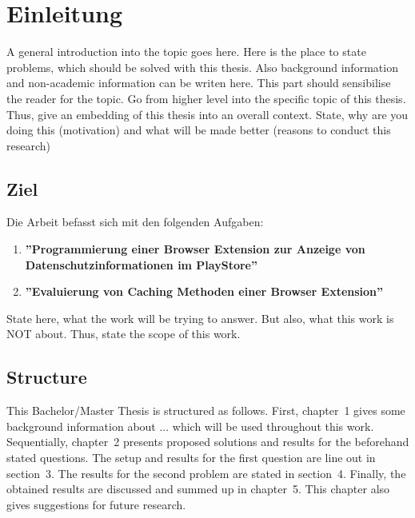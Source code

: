 \chapter{Einleitung}
\label{c:introduction}

A general introduction into the topic goes here. Here is the place to state problems, which should be solved with this thesis. Also background information and non-academic information can be writen here. This part should sensibilise the reader for the topic. Go from higher level into the specific topic of this thesis. Thus, give an embedding of this thesis into an overall context. State, why are you doing this (motivation) and what will be made better (reasons to conduct this research)



\section{Ziel}
\label{s:purpose}

Die Arbeit befasst sich mit den folgenden Aufgaben:
\begin{enumerate}
	\item \textbf{''Programmierung einer Browser Extension zur Anzeige von Datenschutzinformationen im PlayStore''}
	\item \textbf{''Evaluierung von Caching Methoden einer Browser Extension''}
\end{enumerate}

State here, what the work will be trying to answer. But also, what this work is NOT about. Thus, state the scope of this work.


\section{Structure}
\label{s:structure}

This Bachelor/Master Thesis is structured as follows. First, chapter~1 gives some background information about ... which will be used throughout this work. Sequentially, chapter~2 presents proposed solutions and results for the beforehand stated questions. The setup and results for the first question are line out in section~3. The results for the second problem are stated in section~4. Finally, the obtained results are discussed and summed up in chapter~5. This chapter also gives suggestions for future research.




















